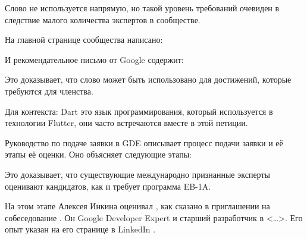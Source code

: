 Слово  не используется напрямую, но такой уровень требований
очевиден в следствие малого количества экспертов в сообществе.

На главной странице сообщества написано:


И рекомендательное письмо от Google содержит:


Это доказывает, что слово  может быть использовано для достижений,
которые требуются для членства.

Для контекста: Dart это язык программирования, который используется в технологии Flutter,
они часто встречаются вместе в этой петиции.



Руководство по подаче заявки в GDE описывает процесс подачи заявки и её этапы её оценки.
Оно объясняет следующие этапы:


Это доказывает, что существующие международно признанные эксперты оценивают кандидатов,
как и требует программа EB-1A.

На этом этапе Алексея Инкина оценивал \MrGdeMemberInterviewer,
как сказано в приглашении на собеседование .
Он Google Developer Expert
и старший разработчик в <\dots>.
Его опыт указан на его странице в LinkedIn .

